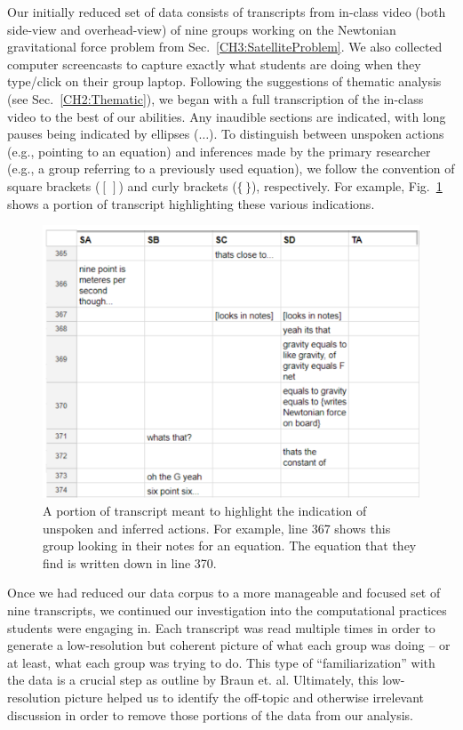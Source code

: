 \documentclass{msuphddissertation}
\begin{document}
\begin{doublespace}
Our initially reduced set of data consists of transcripts from in-class video (both side-view and overhead-view) of nine groups working on the Newtonian gravitational force problem from Sec.~\ref{CH3:SatelliteProblem}.  We also collected computer screencasts to capture exactly what students are doing when they type/click on their group laptop.  Following the suggestions of thematic analysis (see Sec.~\ref{CH2:Thematic}), we began with a full transcription of the in-class video to the best of our abilities.  Any inaudible sections are indicated, with long pauses being indicated by ellipses ($\ldots$).  To distinguish between unspoken actions (e.g., pointing to an equation) and inferences made by the primary researcher (e.g., a group referring to a previously used equation), we follow the convention of square brackets ($[\,]$) and curly brackets ($\{\,\}$), respectively.  For example, Fig.~\ref{CH5:Transcript} shows a portion of transcript highlighting these various indications.

\begin{figure}\centering
\includegraphics[scale=0.75]{./images/CH5Transcript.pdf}
\caption{A portion of transcript meant to highlight the indication of unspoken and inferred actions.  For example, line 367 shows this group looking in their notes for an equation.  The equation that they find is written down in line 370.}\label{CH5:Transcript}
\end{figure}

Once we had reduced our data corpus to a more manageable and focused set of nine transcripts, we continued our investigation into the computational practices students were engaging in.  Each transcript was read multiple times in order to generate a low-resolution but coherent picture of what each group was doing -- or at least, what each group was trying to do.  This type of ``familiarization'' with the data is a crucial step as outline by Braun et. al.  Ultimately, this low-resolution picture helped us to identify the off-topic and otherwise irrelevant discussion in order to remove those portions of the data from our analysis.


\end{doublespace}
\end{document}
